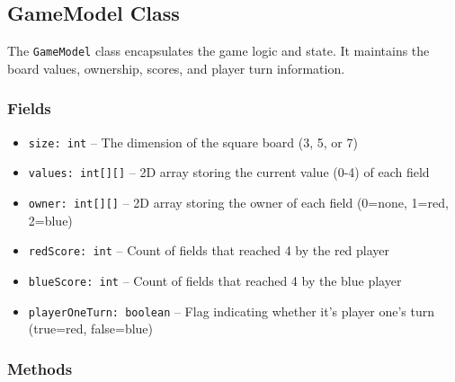 \documentclass[12pt,a4paper]{article}
\begin{document}
\subsection{GameModel Class}

The \texttt{GameModel} class encapsulates the game logic and state. It maintains the board values, ownership, scores, and player turn information.

\subsubsection{Fields}
\begin{itemize}
    \item \texttt{size: int} -- The dimension of the square board (3, 5, or 7)
    \item \texttt{values: int[][]} -- 2D array storing the current value (0-4) of each field
    \item \texttt{owner: int[][]} -- 2D array storing the owner of each field (0=none, 1=red, 2=blue)
    \item \texttt{redScore: int} -- Count of fields that reached 4 by the red player
    \item \texttt{blueScore: int} -- Count of fields that reached 4 by the blue player
    \item \texttt{playerOneTurn: boolean} -- Flag indicating whether it's player one's turn (true=red, false=blue)
\end{itemize}

\subsubsection{Methods}
\end{document}
